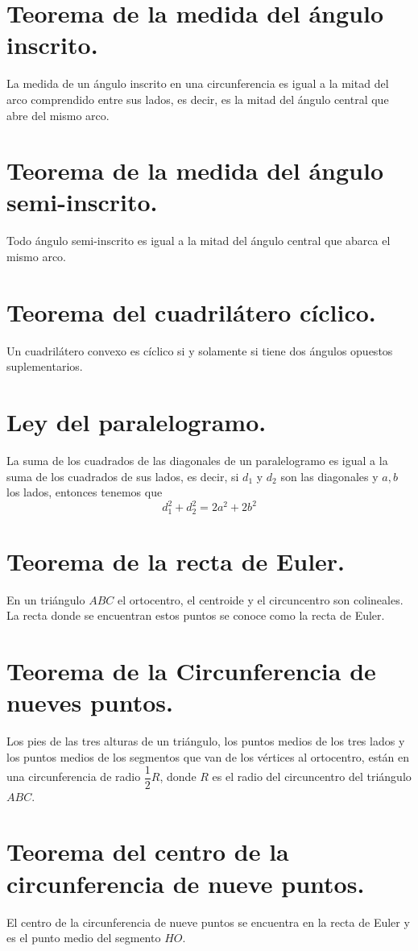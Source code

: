 \documentclass[12pt,a4paper,oneside]{book}
\begin{document}
\section{Teorema de la medida del ángulo inscrito.}
La medida de un ángulo inscrito en una circunferencia es igual a la mitad del arco comprendido entre sus lados, es decir, es la mitad del ángulo central que abre del mismo arco.
\section{Teorema de la medida del ángulo semi-inscrito.}
Todo ángulo semi-inscrito es igual a la mitad del ángulo central que abarca el mismo arco.
\section{Teorema del cuadrilátero cíclico.}
Un cuadrilátero convexo es cíclico si y solamente si tiene dos ángulos opuestos suplementarios.
\section{Ley del paralelogramo.}
La suma de los cuadrados de las diagonales de un paralelogramo es igual a la suma de los cuadrados de sus lados, es decir, si $d_1$ y $d_2$ son las diagonales y $a, b$ los lados, entonces tenemos que 
$$d_1^2 + d_2^2=2a^2+2b^2$$
\section{Teorema de la recta de Euler.}
En un triángulo $ABC$ el ortocentro, el centroide y el circuncentro son colineales. La recta donde se encuentran estos puntos se conoce como la recta de Euler.
\section{Teorema de la Circunferencia de nueves puntos.}
Los pies de las tres alturas de un triángulo, los puntos medios de los tres lados y los puntos medios de los segmentos que van de los vértices al ortocentro, están en una circunferencia de radio $\dfrac{1}{2}R$, donde $R$ es el radio del circuncentro del triángulo $ABC$.
\section{Teorema del centro de la circunferencia de nueve puntos.}
El centro de la circunferencia de nueve puntos se encuentra en la recta de Euler y es el punto medio del segmento $HO$.
\end{document}
